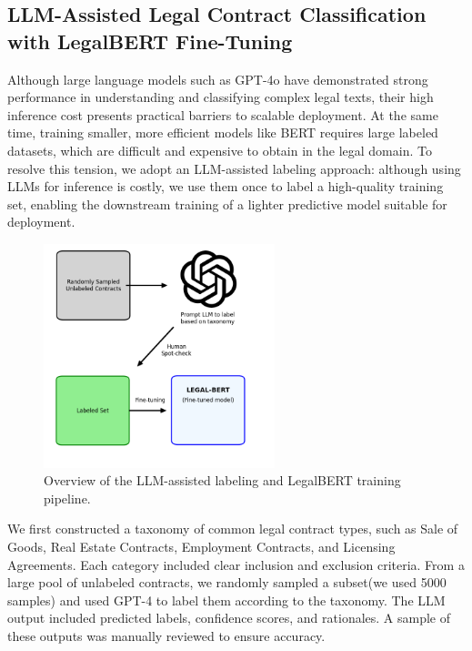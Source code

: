 \documentclass{article}
\begin{document}



\subsection*{LLM-Assisted Legal Contract Classification with LegalBERT Fine-Tuning}

Although large language models such as GPT-4o have demonstrated strong performance in understanding and classifying complex legal texts, their high inference cost presents practical barriers to scalable deployment. At the same time, training smaller, more efficient models like BERT requires large labeled datasets, which are difficult and expensive to obtain in the legal domain. To resolve this tension, we adopt an LLM-assisted labeling approach: although using LLMs for inference is costly, we use them once to label a high-quality training set, enabling the downstream training of a lighter predictive model suitable for deployment.

\begin{figure}[htbp]
    \centering
    \includegraphics[width=0.6\textwidth]{llmtag.png} 
    \caption{Overview of the LLM-assisted labeling and LegalBERT training pipeline.}
    \label{fig:llm_flowchart}
\end{figure}

We first constructed a taxonomy of common legal contract types, such as Sale of Goods, Real Estate Contracts, Employment Contracts, and Licensing Agreements. Each category included clear inclusion and exclusion criteria. From a large pool of unlabeled contracts, we randomly sampled a subset(we used 5000 samples) and used GPT-4 to label them according to the taxonomy. The LLM output included predicted labels, confidence scores, and rationales. A sample of these outputs was manually reviewed to ensure accuracy.
\end{document}
